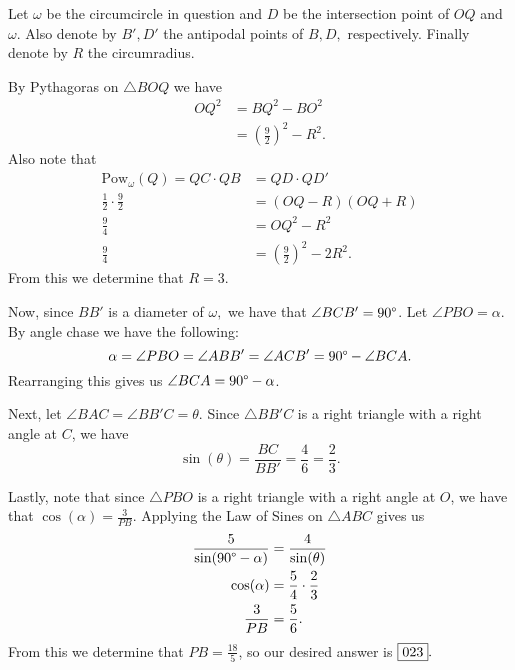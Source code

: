 \documentclass[letterpaper,oneside]{scrartcl}
\begin{document}
\begin{soln}
  Let \(\omega\) be the circumcircle in question and \(D\) be the intersection point of \(OQ\) and \(\omega\). Also denote by \(B', D'\) the antipodal points of \(B,D,\) respectively. Finally denote by \(R\) the circumradius.

  By Pythagoras on \(\triangle BOQ\) we have
  \begin{align*}
    {OQ}^2 &= {BQ}^2 - {BO}^2 \\
    &= \left(\frac{9}{2}\right)^2 - R^2.
  \end{align*}
  Also note that
  \begin{align*}
    \text{Pow}_\omega(Q) = QC \cdot QB &= QD \cdot QD' \\
    \frac12 \cdot \frac92 &= (OQ-R)(OQ+R)\\
    \frac94 &= {OQ}^2 - R^2 \\
    \frac94 &= \left(\frac{9}{2}\right)^2 - 2R^2.
  \end{align*}
  From this we determine that \(R = 3\).

  Now, since \(BB'\) is a diameter of \(\omega,\) we have that \(\angle BCB' = 90\degree\). Let \(\angle PBO = \alpha\). By angle chase we have the following:
  \[\alpha = \angle PBO = \angle ABB' = \angle ACB' = 90\degree - \angle BCA.\]
  Rearranging this gives us \(\angle BCA = 90\degree - \alpha\).

  Next, let \(\angle BAC = \angle BB'C = \theta\). Since \(\triangle BB'C\) is a right triangle with a right angle at \(C\), we have 
  \[\sin(\theta) = \frac{BC}{BB'} = \frac{4}{6}= \frac23.\]

  Lastly, note that since \(\triangle PBO\) is a right triangle with a right angle at \(O\), we have that \(\cos(\alpha) = \frac{3}{PB}\). Applying the Law of Sines on \(\triangle ABC\) gives us 
  \begin{align*}
    \frac{5}{\sin(90\degree - \alpha)} &= \frac{4}{\sin(\theta)} \\
    \cos(\alpha) &= \frac54 \cdot \frac23 \\
    \frac{3}{PB} &= \frac56.
  \end{align*}
  From this we determine that \(PB = \frac{18}{5}\), so our desired answer is \(\fbox{023}.\)
\end{soln}
\end{document}
